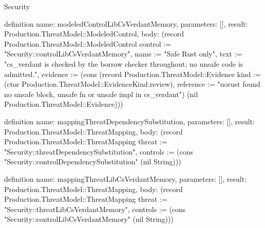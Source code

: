 \begin{lexlean}{Security}
\begin{semanticmodule}
definition{
  name: modeledControlLibCsVerdantMemory,
  parameters: [],
  result: Production.ThreatModel::ModeledControl,
  body: (record Production.ThreatModel::ModeledControl {control := "Security::controlLibCsVerdantMemory", name := "Safe Rust only", text := "cs_verdant is checked by the borrow checker throughout; no unsafe code is admitted.", evidence := (cons (record Production.ThreatModel::Evidence {kind := (ctor Production.ThreatModel::EvidenceKind.review), reference := "uorust found no unsafe block, unsafe fn or unsafe impl in cs_verdant"}) (nil Production.ThreatModel::Evidence))})
}

definition{
  name: mappingThreatDependencySubstitution,
  parameters: [],
  result: Production.ThreatModel::ThreatMapping,
  body: (record Production.ThreatModel::ThreatMapping {threat := "Security::threatDependencySubstitution", controls := (cons "Security::controlDependencySubstitution" (nil String))})
}

definition{
  name: mappingThreatLibCsVerdantMemory,
  parameters: [],
  result: Production.ThreatModel::ThreatMapping,
  body: (record Production.ThreatModel::ThreatMapping {threat := "Security::threatLibCsVerdantMemory", controls := (cons "Security::controlLibCsVerdantMemory" (nil String))})
}
\end{semanticmodule}
\end{lexlean}
